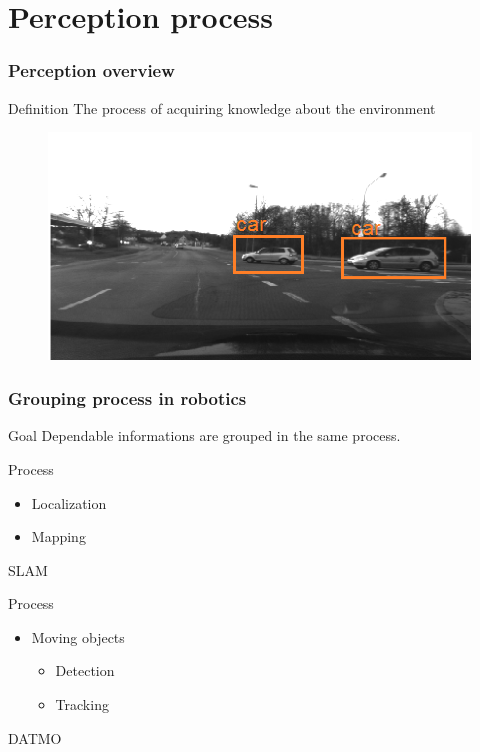 \documentclass{beamer}
\begin{document}
\section{Perception process}

	\begin{frame}
		\frametitle{Perception overview}
		\begin{block}{Definition}
			The process of acquiring knowledge about the environment \cite{iyengar1991autonomous}
		\end{block}	
		
		\begin{figure}[h]
			\center
			\includegraphics[scale=0.3]{img/fig:perception:ex1}
		 \end{figure}
		 
	\end{frame}

	\begin{frame}
		\frametitle{Grouping process in robotics}
		
		\begin{block}{Goal}		
			Dependable informations are grouped in the same process.
		\end{block}			
		
		\begin{exampleblock}{Process}		
		
			\begin{itemize}
			\item Localization
			\item Mapping
			\end{itemize}			
		
			SLAM
		\end{exampleblock}					
				
		\begin{exampleblock}{Process}		
			\begin{itemize}
			\item Moving objects
				\begin{itemize}
				\item Detection
				\item Tracking
				\end{itemize}			
			\end{itemize}			
			DATMO
		\end{exampleblock}						
				
	\end{frame}
\end{document}
